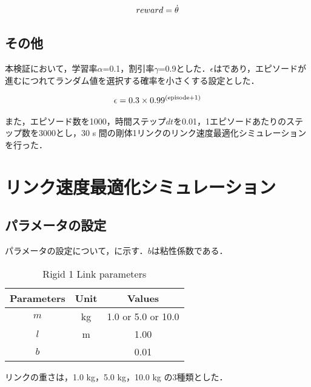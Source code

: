 \begin{eqnarray}
  \equlabel{3.15}
  reward = \dot{\theta}
\end{eqnarray}

\subsection{その他}
本検証において，学習率$\alpha$=0.1，割引率$\gamma$=0.9とした．$\epsilon$はであり，エピソードが進むにつれてランダム値を選択する確率を小さくする設定とした．

\begin{eqnarray}
  \equlabel{3.16}
  \epsilon = 0.3 \times 0.99^{(\mathrm{episode} + 1)}
\end{eqnarray}

また，エピソード数を1000，時間ステップ$dt$を0.01，1エピソードあたりのステップ数を3000とし，30 s 間の剛体1リンクのリンク速度最適化シミュレーションを行った．
\section{リンク速度最適化シミュレーション}
\subsection{パラメータの設定}
パラメータの設定について，に示す．$b$は粘性係数である．
\begin{table}[tb]
  \begin{center}
    \caption{Rigid 1 Link parameters}
    \begin{tabular}{c|c|c}
      \hline
      Parameters & Unit & Values \\
      \hline
      $m$ & kg & 1.0 or 5.0 or 10.0\\
      $l$ & m & 1.00 \\
      $b$ &  & 0.01 \\
      \hline
    \end{tabular}
  \end{center}
\end{table}
リンクの重さは，1.0 kg，5.0 kg，10.0 kg の3種類とした．
